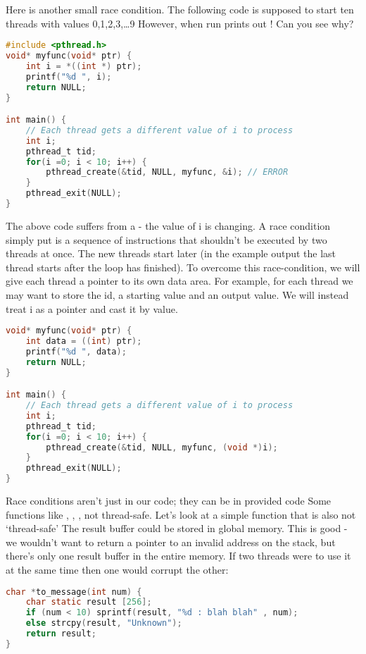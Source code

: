 Here is another small race condition.
The following code is supposed to start ten threads with values 0,1,2,3,\ldots{}9 However, when run prints out !
Can you see why?

\begin{lstlisting}[language=C]
#include <pthread.h>
void* myfunc(void* ptr) {
    int i = *((int *) ptr);
    printf("%d ", i);
    return NULL;
}

int main() {
    // Each thread gets a different value of i to process
    int i;
    pthread_t tid;
    for(i =0; i < 10; i++) {
        pthread_create(&tid, NULL, myfunc, &i); // ERROR
    }
    pthread_exit(NULL);
}
\end{lstlisting}

The above code suffers from a  - the value of i is changing.
A race condition simply put is a sequence of instructions that shouldn't be executed by two threads at once.
The new threads start later (in the example output the last thread starts after the loop has finished).
To overcome this race-condition, we will give each thread a pointer to its own data area. For example, for each thread we may want to store the id, a starting value and an output value. We will instead treat i as a pointer and cast it by value.

\begin{lstlisting}[language=C]
void* myfunc(void* ptr) {
    int data = ((int) ptr);
    printf("%d ", data);
    return NULL;
}

int main() {
    // Each thread gets a different value of i to process
    int i;
    pthread_t tid;
    for(i =0; i < 10; i++) {
        pthread_create(&tid, NULL, myfunc, (void *)i);
    }
    pthread_exit(NULL);
}
\end{lstlisting}

Race conditions aren't just in our code; they can be in provided code
Some functions like , , ,  not thread-safe.
Let's look at a simple function that is also not `thread-safe' The result buffer could be stored in global memory.
This is good - we wouldn't want to return a pointer to an invalid address on the stack, but there's only one result buffer in the entire memory.
If two threads were to use it at the same time then one would corrupt the other:

\begin{lstlisting}[language=C]
char *to_message(int num) {
    char static result [256];
    if (num < 10) sprintf(result, "%d : blah blah" , num);
    else strcpy(result, "Unknown");
    return result;
}
\end{lstlisting}


